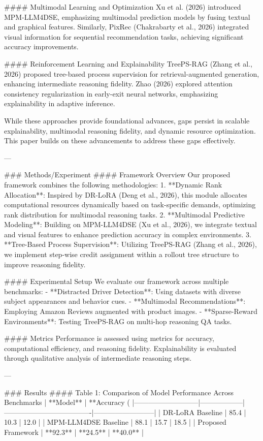 #### Multimodal Learning and Optimization  
Xu et al. (2026) introduced MPM-LLM4DSE, emphasizing multimodal prediction models by fusing textual and graphical features. Similarly, PixRec (Chakrabarty et al., 2026) integrated visual information for sequential recommendation tasks, achieving significant accuracy improvements.

#### Reinforcement Learning and Explainability  
TreePS-RAG (Zhang et al., 2026) proposed tree-based process supervision for retrieval-augmented generation, enhancing intermediate reasoning fidelity. Zhao (2026) explored attention consistency regularization in early-exit neural networks, emphasizing explainability in adaptive inference.

While these approaches provide foundational advances, gaps persist in scalable explainability, multimodal reasoning fidelity, and dynamic resource optimization. This paper builds on these advancements to address these gaps effectively.

---

### Methods/Experiment  
#### Framework Overview  
Our proposed framework combines the following methodologies:  
1. **Dynamic Rank Allocation**: Inspired by DR-LoRA (Deng et al., 2026), this module allocates computational resources dynamically based on task-specific demands, optimizing rank distribution for multimodal reasoning tasks.  
2. **Multimodal Predictive Modeling**: Building on MPM-LLM4DSE (Xu et al., 2026), we integrate textual and visual features to enhance prediction accuracy in complex environments.  
3. **Tree-Based Process Supervision**: Utilizing TreePS-RAG (Zhang et al., 2026), we implement step-wise credit assignment within a rollout tree structure to improve reasoning fidelity.

#### Experimental Setup  
We evaluate our framework across multiple benchmarks:  
- **Distracted Driver Detection**: Using datasets with diverse subject appearances and behavior cues.  
- **Multimodal Recommendations**: Employing Amazon Reviews augmented with product images.  
- **Sparse-Reward Environments**: Testing TreePS-RAG on multi-hop reasoning QA tasks.

#### Metrics  
Performance is assessed using metrics for accuracy, computational efficiency, and reasoning fidelity. Explainability is evaluated through qualitative analysis of intermediate reasoning steps.

---

### Results  
#### Table 1: Comparison of Model Performance Across Benchmarks  
| **Model**                | **Accuracy (%
|---------------------------|------------------|-------------------------------------|--------------------------|
| DR-LoRA Baseline          | 85.4            | 10.3                               | 12.0                    |
| MPM-LLM4DSE Baseline      | 88.1            | 15.7                               | 18.5                    |
| Proposed Framework        | **92.3**        | **24.5**                           | **40.0**                |


